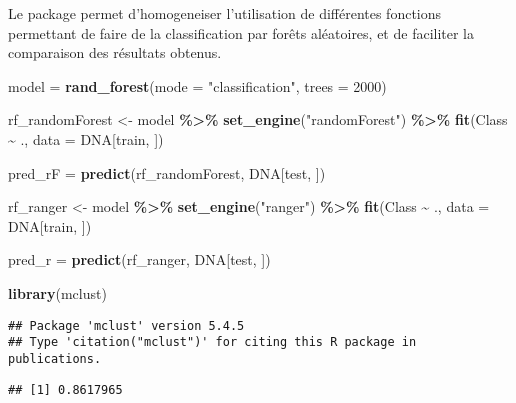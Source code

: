 \documentclass[]{article}
\newenvironment{Shaded}{\begin{snugshade}}{\end{snugshade}}
\newcommand{\DataTypeTok}[1]{\textcolor[rgb]{0.13,0.29,0.53}{#1}}
\newcommand{\DecValTok}[1]{\textcolor[rgb]{0.00,0.00,0.81}{#1}}
\newcommand{\KeywordTok}[1]{\textcolor[rgb]{0.13,0.29,0.53}{\textbf{#1}}}
\newcommand{\NormalTok}[1]{#1}
\newcommand{\OperatorTok}[1]{\textcolor[rgb]{0.81,0.36,0.00}{\textbf{#1}}}
\newcommand{\StringTok}[1]{\textcolor[rgb]{0.31,0.60,0.02}{#1}}
\begin{document}
Le package permet d'homogeneiser l'utilisation de différentes fonctions
permettant de faire de la classification par forêts aléatoires, et de
faciliter la comparaison des résultats obtenus.

\begin{Shaded}
\begin{Highlighting}[]
\NormalTok{model =}\StringTok{ }\KeywordTok{rand\_forest}\NormalTok{(}\DataTypeTok{mode =} \StringTok{"classification"}\NormalTok{, }\DataTypeTok{trees =} \DecValTok{2000}\NormalTok{)}

\NormalTok{rf\_randomForest <{-}}\StringTok{ }
\StringTok{  }\NormalTok{model }\OperatorTok{\%>\%}
\StringTok{  }\KeywordTok{set\_engine}\NormalTok{(}\StringTok{"randomForest"}\NormalTok{) }\OperatorTok{\%>\%}
\StringTok{  }\KeywordTok{fit}\NormalTok{(Class }\OperatorTok{\textasciitilde{}}\StringTok{ }\NormalTok{., }\DataTypeTok{data =}\NormalTok{ DNA[train, ]) }

\NormalTok{pred\_rF =}\StringTok{ }\KeywordTok{predict}\NormalTok{(rf\_randomForest, DNA[test, ])}

\NormalTok{rf\_ranger <{-}}
\StringTok{  }\NormalTok{model }\OperatorTok{\%>\%}
\StringTok{  }\KeywordTok{set\_engine}\NormalTok{(}\StringTok{"ranger"}\NormalTok{) }\OperatorTok{\%>\%}
\StringTok{  }\KeywordTok{fit}\NormalTok{(Class }\OperatorTok{\textasciitilde{}}\StringTok{ }\NormalTok{., }\DataTypeTok{data =}\NormalTok{ DNA[train, ])}

\NormalTok{pred\_r =}\StringTok{ }\KeywordTok{predict}\NormalTok{(rf\_ranger, DNA[test, ])}

\KeywordTok{library}\NormalTok{(mclust)}
\end{Highlighting}
\end{Shaded}

\begin{verbatim}
## Package 'mclust' version 5.4.5
## Type 'citation("mclust")' for citing this R package in publications.
\end{verbatim}

\begin{Shaded}
\end{Shaded}

\begin{verbatim}
## [1] 0.8617965
\end{verbatim}
\end{document}
